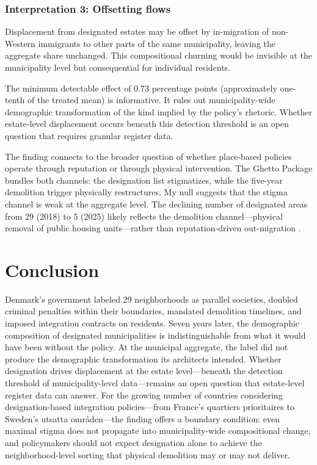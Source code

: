 \documentclass[12pt]{article}
\begin{document}
\subsubsection*{Interpretation 3: Offsetting flows} Displacement from designated estates may be offset by in-migration of non-Western immigrants to other parts of the same municipality, leaving the aggregate share unchanged. This compositional churning would be invisible at the municipality level but consequential for individual residents.

The minimum detectable effect of 0.73 percentage points (approximately one-tenth of the treated mean) is informative. It rules out municipality-wide demographic transformation of the kind implied by the policy's rhetoric. Whether estate-level displacement occurs beneath this detection threshold is an open question that requires granular register data.

The finding connects to the broader question of whether place-based policies operate through reputation or through physical intervention. The Ghetto Package bundles both channels: the designation list stigmatizes, while the five-year demolition trigger physically restructures. My null suggests that the stigma channel is weak at the aggregate level. The declining number of designated areas from 29 (2018) to 5 (2025) likely reflects the demolition channel---physical removal of public housing units---rather than reputation-driven out-migration \citep{oecd2020housing}.

\section{Conclusion}

Denmark's government labeled 29 neighborhoods as parallel societies, doubled criminal penalties within their boundaries, mandated demolition timelines, and imposed integration contracts on residents. Seven years later, the demographic composition of designated municipalities is indistinguishable from what it would have been without the policy. At the municipal aggregate, the label did not produce the demographic transformation its architects intended. Whether designation drives displacement at the estate level---beneath the detection threshold of municipality-level data---remains an open question that estate-level register data can answer. For the growing number of countries considering designation-based integration policies---from France's quartiers prioritaires to Sweden's utsatta omr{\aa}den---the finding offers a boundary condition: even maximal stigma does not propagate into municipality-wide compositional change, and policymakers should not expect designation alone to achieve the neighborhood-level sorting that physical demolition may or may not deliver.
\end{document}

